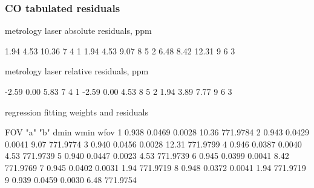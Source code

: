 \documentclass[10pt]{beamer}
\begin{document}
\begin{frame}[fragile]
\frametitle{CO tabulated residuals}

  metrology laser absolute residuals, ppm
\begin{semiverbatim}\scriptsize
      1.94     4.53    10.36         7   4   1
      1.94     4.53     9.07         8   5   2
      6.48     8.42    12.31         9   6   3
\end{semiverbatim}

  metrology laser relative residuals, ppm
\begin{semiverbatim}\scriptsize
     -2.59     0.00     5.83         7   4   1
     -2.59     0.00     4.53         8   5   2
      1.94     3.89     7.77         9   6   3
\end{semiverbatim}

     regression fitting weights and residuals
\begin{semiverbatim}\scriptsize
 FOV   "a"       "b"     dmin     wmin      wfov
  1   0.938    0.0469   0.0028    10.36   771.9784 
  2   0.943    0.0429   0.0041     9.07   771.9774 
  3   0.940    0.0456   0.0028    12.31   771.9799 
  4   0.946    0.0387   0.0040     4.53   771.9739 
  5   0.940    0.0447   0.0023     4.53   771.9739 
  6   0.945    0.0399   0.0041     8.42   771.9769 
  7   0.945    0.0402   0.0031     1.94   771.9719 
  8   0.948    0.0372   0.0041     1.94   771.9719 
  9   0.939    0.0459   0.0030     6.48   771.9754 
\end{semiverbatim}

\end{frame}
\end{document}
